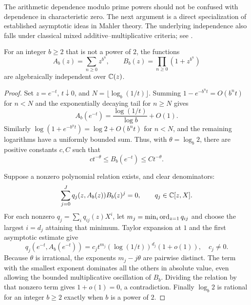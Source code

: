 The arithmetic dependence modulo prime powers should not be confused
with dependence in characteristic zero. The next argument is a direct
specialization of established asymptotic ideas in Mahler theory. The
underlying independence also falls under classical mixed
additive--multiplicative criteria; see \cite{Kubota,Vaananen}.

\begin{theorem}\label{thm:independence}
For an integer $b\ge2$ that is not a power of $2$, the functions
\[
 A_b(z)=\sum_{n\ge0}z^{b^n},\qquad
 B_b(z)=\prod_{n\ge0}(1+z^{b^n})
\]
are algebraically independent over $\mathbb C(z)$.
\end{theorem}
\begin{proof}
Set $z=e^{-t}$, $t\downarrow0$, and
$N=\lfloor\log_b(1/t)\rfloor$. Summing
$1-e^{-b^nt}=O(b^nt)$ for $n<N$ and the exponentially decaying tail
for $n\ge N$ gives
\[
 A_b(e^{-t})=\frac{\log(1/t)}{\log b}+O(1).
\]
Similarly $\log(1+e^{-b^nt})=\log2+O(b^nt)$ for $n<N$, and the
remaining logarithms have a uniformly bounded sum. Thus, with
$\theta=\log_b2$, there are positive constants $c,C$ such that
\[
 ct^{-\theta}\le B_b(e^{-t})\le Ct^{-\theta}.
\]

Suppose a nonzero polynomial relation exists, and clear denominators:
\[
 \sum_{j=0}^J q_j(z,A_b(z))B_b(z)^j=0,
       \qquad q_j\in\mathbb C[z,X].
\]
For each nonzero $q_j=\sum_i q_{ij}(z)X^i$, let
$m_j=\min_i\operatorname{ord}_{z=1}q_{ij}$ and choose the largest $i=d_j$
attaining that minimum. Taylor expansion at $1$ and the first
asymptotic estimate give
\[
 q_j(e^{-t},A_b(e^{-t}))
    =c_jt^{m_j}(\log(1/t))^{d_j}(1+o(1)),\quad c_j\ne0.
\]
Because $\theta$ is irrational, the exponents $m_j-j\theta$ are
pairwise distinct. The term with the smallest exponent dominates all
the others in absolute value, even allowing the bounded multiplicative
oscillation of $B_b$. Dividing the relation by that nonzero term gives
$1+o(1)=0$, a contradiction. Finally $\log_b2$ is rational for an
integer $b\ge2$ exactly when $b$ is a power of $2$.
\end{proof}

